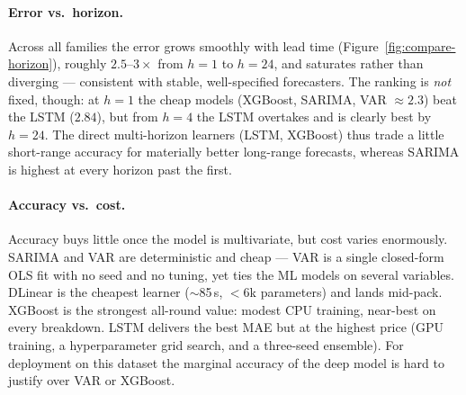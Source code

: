 \documentclass[12pt,a4paper,oneside]{report}
\begin{document}
\paragraph{Error vs.\ horizon.} Across all families the error grows smoothly with
lead time (Figure~\ref{fig:compare-horizon}), roughly $2.5$--$3\times$ from $h{=}1$
to $h{=}24$, and saturates rather than diverging --- consistent with stable,
well-specified forecasters. The ranking is \emph{not} fixed, though: at $h{=}1$ the
cheap models (XGBoost, SARIMA, VAR $\approx 2.3$) beat the LSTM ($2.84$), but from
$h{=}4$ the LSTM overtakes and is clearly best by $h{=}24$. The direct multi-horizon
learners (LSTM, XGBoost) thus trade a little short-range accuracy for materially
better long-range forecasts, whereas SARIMA is highest at every horizon past the
first.

\paragraph{Accuracy vs.\ cost.} Accuracy buys little once the model is
multivariate, but cost varies enormously. SARIMA and VAR are deterministic and
cheap --- VAR is a single closed-form OLS fit with no seed and no tuning, yet ties
the ML models on several variables. DLinear is the cheapest learner ($\sim$85\,s,
$<$6k parameters) and lands mid-pack. XGBoost is the strongest all-round value:
modest CPU training, near-best on every breakdown. LSTM delivers the best MAE but
at the highest price (GPU training, a hyperparameter grid search, and a three-seed
ensemble). For deployment on this dataset the marginal accuracy of the deep model
is hard to justify over VAR or XGBoost.
\end{document}
